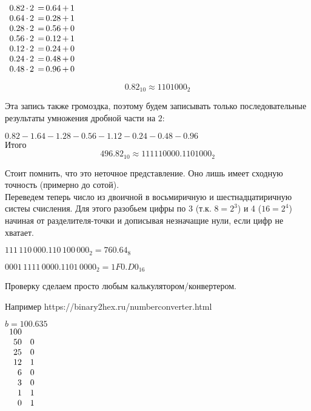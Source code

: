 \documentclass[a4paper,12pt]{article}
\begin{document}
$\begin{array}{r @{\, \cdot \, 2 \, = \,} l @{\, + \,} l}
0.82 & 0.64 & 1 \\
0.64 & 0.28 & 1 \\
0.28 & 0.56 & 0 \\
0.56 & 0.12 & 1 \\
0.12 & 0.24 & 0 \\
0.24 & 0.48 & 0 \\
0.48 & 0.96 & 0 \\
\end{array}$

\[0.82_{10} \approx 1101000_2\]

Эта запись также громоздка, поэтому будем записывать только последовательные результаты умножения дробной части на $2$:

$0.82 - 1.64 - 1.28 - 0.56 - 1.12 - 0.24 - 0.48 - 0.96$
\\

Итого 
\[496.82_{10} \approx 111110000.1101000_2\]

Стоит помнить, что это неточное представление. Оно лишь имеет сходную точность (примерно до сотой).
\\

Переведем теперь число из двоичной в восьмиричную и шестнадцатиричную систеы счисления.
Для этого разобьем цифры по 3 (т.к. $8 = 2^3$) и 4 ($16 = 2^4$) начиная от разделителя-точки и дописывая незначащие нули, если цифр не хватает.

$111\,110\,000.110\,100\,000_2 = 760.64_8$

$0001\,1111\,0000.1101\,0000_2 = 1F0.D0_{16}$


Проверку сделаем просто любым калькулятором/конвертером.

Например https://binary2hex.ru/numberconverter.html

\newpage




$b = 100.635$
\\

$\begin{array}{r l}
100 & \\
50 & 0 \\
25 & 0 \\
12 & 1 \\
6 & 0 \\
3 & 0 \\
1 & 1 \\
0 & 1 \\
\end{array}$
\end{document}

